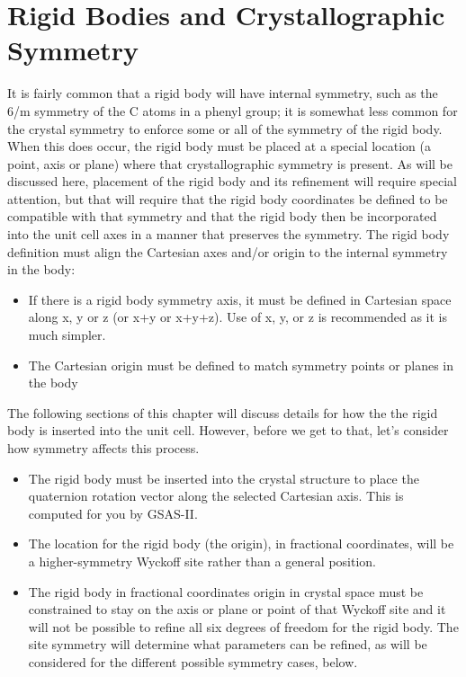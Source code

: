\section{Rigid Bodies and Crystallographic Symmetry}\label{ref:RBsym}
It is fairly common that a rigid body will have internal symmetry, such as the 6/m symmetry of the C atoms in a phenyl group; it is somewhat less common for the crystal symmetry to enforce some or all of the symmetry of the rigid body. When this does occur, the rigid body must be placed at a special location (a point, axis or plane) where that crystallographic symmetry is present. As will be discussed here, placement of the rigid body and its refinement will require special attention, but that will require that the rigid body coordinates be defined to be compatible with that symmetry and that the rigid body then be incorporated into the unit cell axes in a manner that preserves the symmetry. The rigid body definition must align the Cartesian axes and/or origin to the internal symmetry in the body: 
\begin{itemize}
    \item If there is a rigid body symmetry axis, it must be defined in Cartesian space along x, y or z (or x+y or x+y+z). Use of x, y, or z is recommended as it is much simpler. 
    \item The Cartesian origin must be defined to match symmetry points or planes in the body
\end{itemize}

The following sections of this chapter will discuss details for how the the rigid body is inserted into the unit cell. However, before we get to that, let's consider how symmetry affects this process. 

\begin{itemize}
    \item The rigid body must be inserted into the crystal structure to place the quaternion rotation vector along the selected Cartesian axis. This is computed for you by GSAS-II. 
    \item The location for the rigid body (the origin), in fractional coordinates, will be a higher-symmetry Wyckoff site rather than a general position.
    \item The rigid body in fractional coordinates origin in crystal space must be constrained to stay on the axis or plane or point of that Wyckoff site and it will not be possible to refine all six degrees of freedom for the rigid body. The site symmetry will determine what parameters can be refined, as will be considered for the different possible symmetry cases, below.
\end{itemize}

